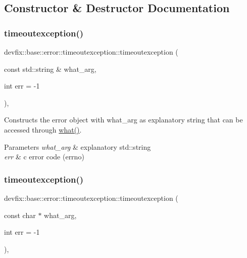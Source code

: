 \subsection{Constructor \& Destructor Documentation}
\mbox{\label{structdevfix_1_1base_1_1error_1_1timeoutexception_abb684b432a5367385d8f975898226c8d}} 
\subsubsection{\texorpdfstring{timeoutexception()}{timeoutexception()}\hspace{0.1cm}{\footnotesize\ttfamily [1/2]}}
{\footnotesize\ttfamily devfix\+::base\+::error\+::timeoutexception\+::timeoutexception (\begin{DoxyParamCaption}\item[{const std\+::string \&}]{what\+\_\+arg,  }\item[{int}]{err = {\ttfamily -\/1} }\end{DoxyParamCaption})\hspace{0.3cm}{\ttfamily [inline]}, {\ttfamily [explicit]}}

Constructs the error object with what\+\_\+arg as explanatory string that can be accessed through \hyperlink{structdevfix_1_1base_1_1error_1_1baseexception_a16327152a55d65b1e537825231fbd452}{what()}. 
\begin{DoxyParams}{Parameters}
{\em what\+\_\+arg} & explanatory std\+::string \\
\hline
{\em err} & c error code (errno) \\
\hline
\end{DoxyParams}
\mbox{\label{structdevfix_1_1base_1_1error_1_1timeoutexception_a7096cca05d73ac6da75746d1737e1ec1}} 
\subsubsection{\texorpdfstring{timeoutexception()}{timeoutexception()}\hspace{0.1cm}{\footnotesize\ttfamily [2/2]}}
{\footnotesize\ttfamily devfix\+::base\+::error\+::timeoutexception\+::timeoutexception (\begin{DoxyParamCaption}\item[{const char $\ast$}]{what\+\_\+arg,  }\item[{int}]{err = {\ttfamily -\/1} }\end{DoxyParamCaption})\hspace{0.3cm}{\ttfamily [inline]}, {\ttfamily [explicit]}}


